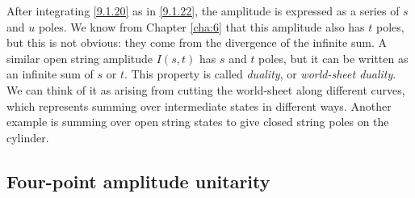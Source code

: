 After integrating \eqref{9.1.20} as in \eqref{9.1.22}, the amplitude is expressed as a series of $s$ and $u$ poles. We know from Chapter \ref{cha:6} that this amplitude also has $t$ poles, but this is not obvious: 
they come from the divergence of the infinite sum.
A similar open string amplitude $I(s, t)$ has $s$ and $t$ poles, but it can be written as an infinite sum of $s$ or $t$. 
This property is called \emph{duality}, or \emph{world-sheet duality}. We can think of it as arising from cutting the world-sheet along different curves, which represents summing over intermediate states in different ways. 
Another example is summing over open string states to give closed string poles on the cylinder.

\subsection*{Four-point amplitude unitarity}

